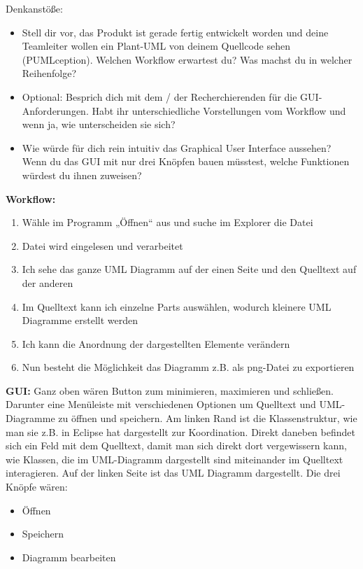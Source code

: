 Denkanstöße:
\begin{itemize}
\item Stell dir vor, das Produkt ist gerade fertig entwickelt worden und deine Teamleiter wollen ein Plant-UML von deinem Quellcode sehen (PUMLception). Welchen Workflow erwartest du? Was machst du in welcher Reihenfolge?
\item Optional: Besprich dich mit dem / der Recherchierenden für die GUI-Anforderungen. Habt ihr unterschiedliche Vorstellungen vom Workflow und wenn ja, wie unterscheiden sie sich?
\item Wie würde für dich rein intuitiv das Graphical User Interface aussehen? Wenn du das GUI mit nur drei Knöpfen bauen müsstest, welche Funktionen würdest du ihnen zuweisen?
\end{itemize}
\textbf{Workflow:}
\begin{enumerate}
\item Wähle im Programm „Öffnen“ aus und suche im Explorer die Datei
\item Datei wird eingelesen und verarbeitet
\item Ich sehe das ganze UML Diagramm auf der einen Seite und den Quelltext auf der anderen
\item Im Quelltext kann ich einzelne Parts auswählen, wodurch kleinere UML Diagramme erstellt werden
\item Ich kann die Anordnung der dargestellten Elemente verändern
\item Nun besteht die Möglichkeit das Diagramm z.B. als png-Datei zu exportieren
\end{enumerate}
 

\textbf{GUI:}
Ganz oben wären Button zum minimieren, maximieren und schließen. Darunter eine Menüleiste mit
verschiedenen Optionen um Quelltext und UML-Diagramme zu öffnen und speichern.
Am linken Rand ist die Klassenstruktur, wie man sie z.B. in Eclipse hat dargestellt zur Koordination.
Direkt daneben befindet sich ein Feld mit dem Quelltext, damit man sich direkt dort vergewissern
kann, wie Klassen, die im UML-Diagramm dargestellt sind miteinander im Quelltext interagieren.
Auf der linken Seite ist das UML Diagramm dargestellt.
Die drei Knöpfe wären:
\begin{itemize}
\item Öffnen
\item Speichern
\item Diagramm bearbeiten
\end{itemize}



\nsecend